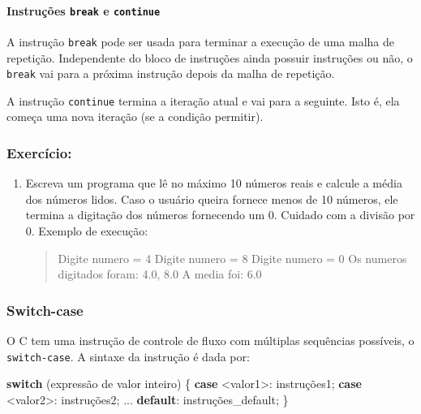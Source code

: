 \documentclass[
]{article}
\newenvironment{Shaded}{}{}
\newcommand{\ControlFlowTok}[1]{\textcolor[rgb]{0.00,0.44,0.13}{\textbf{#1}}}
\newcommand{\NormalTok}[1]{#1}
\begin{document}
\hypertarget{instruuxe7uxf5es-break-e-continue}{%
\paragraph{\texorpdfstring{Instruções \texttt{break} e
\texttt{continue}}{Instruções break e continue}}\label{instruuxe7uxf5es-break-e-continue}}

A instrução \texttt{break} pode ser usada para terminar a execução de
uma malha de repetição. Independente do bloco de instruções ainda
possuir instruções ou não, o \texttt{break} vai para a próxima instrução
depois da malha de repetição.

A instrução \texttt{continue} termina a iteração atual e vai para a
seguinte. Isto é, ela começa uma nova iteração (se a condição permitir).

\hypertarget{exercuxedcio}{%
\subsubsection{Exercício:}\label{exercuxedcio}}

\begin{enumerate}
\def\labelenumi{\arabic{enumi}.}
\item
  Escreva um programa que lê no máximo 10 números reais e calcule a
  média dos números lidos. Caso o usuário queira fornece menos de 10
  números, ele termina a digitação dos números fornecendo um 0. Cuidado
  com a divisão por 0. Exemplo de execução:

  \begin{quote}
  Digite numero = 4 Digite numero = 8 Digite numero = 0 Os numeros
  digitados foram: 4.0, 8.0 A media foi: 6.0
  \end{quote}
\end{enumerate}

\hypertarget{switch-case}{%
\subsubsection{Switch-case}\label{switch-case}}

O C tem uma instrução de controle de fluxo com múltiplas sequências
possíveis, o \texttt{switch-case}. A sintaxe da instrução é dada por:

\begin{Shaded}
\begin{Highlighting}[]
\ControlFlowTok{switch}\NormalTok{ (expressão de valor inteiro) \{}
  \ControlFlowTok{case}\NormalTok{ <valor1>:}
\NormalTok{    instruções1;}
  \ControlFlowTok{case}\NormalTok{ <valor2>:}
\NormalTok{    instruções2;}
\NormalTok{  ...}
  \ControlFlowTok{default}\NormalTok{:}
\NormalTok{    instruções_default;}
\NormalTok{\}}
\end{Highlighting}
\end{Shaded}
\end{document}
